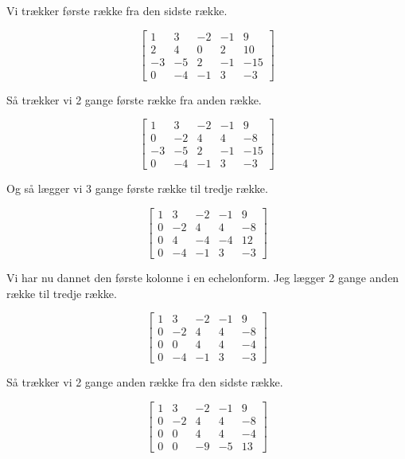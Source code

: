\documentclass{article}
\begin{document}
Vi trækker første række fra den sidste række.

\begin{equation}
\left[
\begin{array}{rrrr|r}
1 & 3 & -2 & -1 & 9 \\
2 & 4 & 0 & 2 & 10 \\
-3 & -5 & 2 & -1 & -15 \\
0 & -4 & -1 & 3 & -3
\end{array}
\right]
\end{equation}

Så trækker vi 2 gange første række fra anden række.

\begin{equation}
\left[
\begin{array}{rrrr|r}
1 & 3 & -2 & -1 & 9 \\
0 & -2 & 4 & 4 & -8 \\
-3 & -5 & 2 & -1 & -15 \\
0 & -4 & -1 & 3 & -3
\end{array}
\right]
\end{equation}

Og så lægger vi 3 gange første række til tredje række.

\begin{equation}
\left[
\begin{array}{rrrr|r}
1 & 3 & -2 & -1 & 9 \\
0 & -2 & 4 & 4 & -8 \\
0 & 4 & -4 & -4 & 12 \\
0 & -4 & -1 & 3 & -3
\end{array}
\right]
\end{equation}

Vi har nu dannet den første kolonne i en echelonform. 
Jeg lægger 2 gange anden række til tredje række.

\begin{equation}
\left[
\begin{array}{rrrr|r}
1 & 3 & -2 & -1 & 9 \\
0 & -2 & 4 & 4 & -8 \\
0 & 0 & 4 & 4 & -4 \\
0 & -4 & -1 & 3 & -3
\end{array}
\right]
\end{equation}

Så trækker vi 2 gange anden række fra den sidste række.

\begin{equation}
\left[
\begin{array}{rrrr|r}
1 & 3 & -2 & -1 & 9 \\
0 & -2 & 4 & 4 & -8 \\
0 & 0 & 4 & 4 & -4 \\
0 & 0 & -9 & -5 & 13
\end{array}
\right]
\end{equation}
\end{document}
